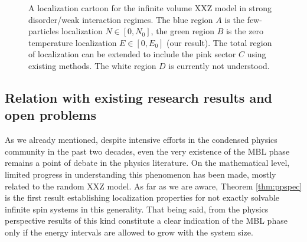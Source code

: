 \documentclass[12pt, a4paper,reqno]{amsart}
\numberwithin{equation}{section}
\begin{document}
 \begin{figure}
\begin{center}
\end{center}
\caption{A localization cartoon for the infinite volume XXZ model in  strong disorder/weak interaction regimes. The  blue region $A$ is the few-particles localization $N\in [0,N_0]$, the  green region $B$ is the zero temperature localization $E\in[0, E_0]$  (our result). The total region of localization can be extended to include the pink sector $C$ using existing methods. The white region $D$ is currently not understood.}\label{fig1}
\end{figure}

\subsection{Relation with existing research results and open problems}\label{subsec:past}
As we already mentioned, despite intensive efforts in the condensed physics community in the past two decades, even the very existence of the MBL phase remains a point of debate in the physics literature. On the mathematical level,   limited progress in understanding this phenomenon has been made, mostly related to the random XXZ model. As far as we are aware, Theorem \ref{thm:ppspec} is the first result  establishing localization properties for not exactly solvable infinite spin systems in this generality.  That being said, from the physics perspective results of this kind constitute a clear indication of the MBL phase only if the energy intervals are allowed to grow with the system size. 
\end{document}
